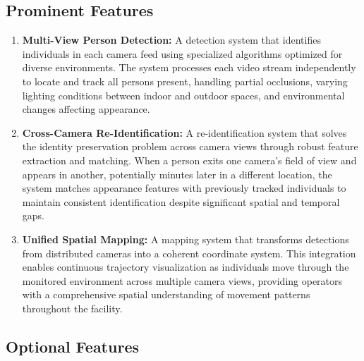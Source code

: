 \subsection{Prominent Features}
\label{subsection:main-features}

\begin{enumerate}[leftmargin=80pt]
    \item \textbf{Multi-View Person Detection:} A detection system that identifies individuals in each camera feed using specialized algorithms optimized for diverse environments. The system processes each video stream independently to locate and track all persons present, handling partial occlusions, varying lighting conditions between indoor and outdoor spaces, and environmental changes affecting appearance.
    
    \item \textbf{Cross-Camera Re-Identification:} A re-identification system that solves the identity preservation problem across camera views through robust feature extraction and matching. When a person exits one camera's field of view and appears in another, potentially minutes later in a different location, the system matches appearance features with previously tracked individuals to maintain consistent identification despite significant spatial and temporal gaps.
    
    \item \textbf{Unified Spatial Mapping:} A mapping system that transforms detections from distributed cameras into a coherent coordinate system. This integration enables continuous trajectory visualization as individuals move through the monitored environment across multiple camera views, providing operators with a comprehensive spatial understanding of movement patterns throughout the facility.
\end{enumerate}

\subsection{Optional Features}
\label{subsection:optional-features}

